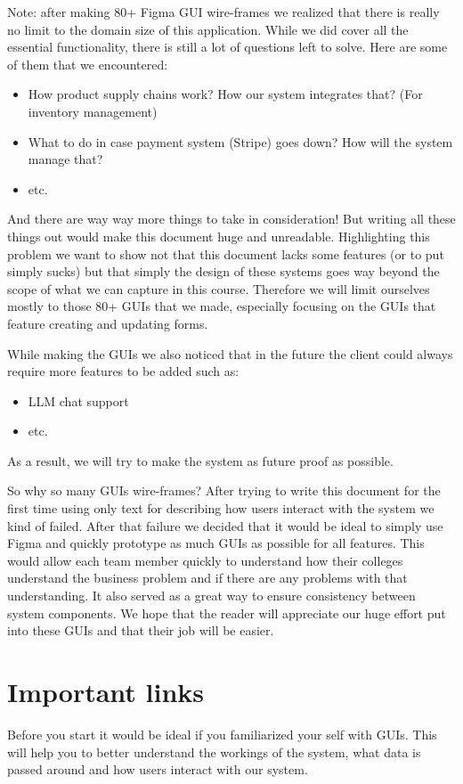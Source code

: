 \documentclass[]{VUMIFTemplateClass}
\begin{document}
Note: after making 80+ Figma GUI wire-frames we realized that there is really no limit to the domain size of this application. While we did cover all the essential functionality, there is still a lot of questions left to solve. Here are some of them that we encountered:
\begin{itemize}
    \item How product supply chains work? How our system integrates that? (For inventory management)
    \item What to do in case payment system (Stripe) goes down? How will the system manage that?
    \item etc.
\end{itemize}
And there are way way more things to take in consideration! But writing all these things out would make this document huge and unreadable. Highlighting this problem we want to show not that this document lacks some features (or to put simply sucks) but that simply the design of these systems goes way beyond the scope of what we can capture in this course. Therefore we will limit ourselves mostly to those 80+ GUIs that we made, especially focusing on the GUIs that feature creating and updating forms.

While making the GUIs we also noticed that in the future the client could always require more features to be added such as:
\begin{itemize}
    \item LLM chat support
    \item etc.
\end{itemize}
As a result, we will try to make the system as future proof as possible.

So why so many GUIs wire-frames? After trying to write this document for the first time using only text for describing how users interact with the system we kind of failed. After that failure we decided that it would be ideal to simply use Figma and quickly prototype as much GUIs as possible for all features. This would allow each team member quickly to understand how their colleges understand the business problem and if there are any problems with that understanding. It also served as a great way to ensure consistency between system components. We hope that the reader will appreciate our huge effort put into these GUIs and that their job will be easier.

\section*{Important links}
Before you start it would be ideal if you familiarized your self with GUIs. This will help you to better understand the workings of the system, what data is passed around and how users interact with our system.
\end{document}
